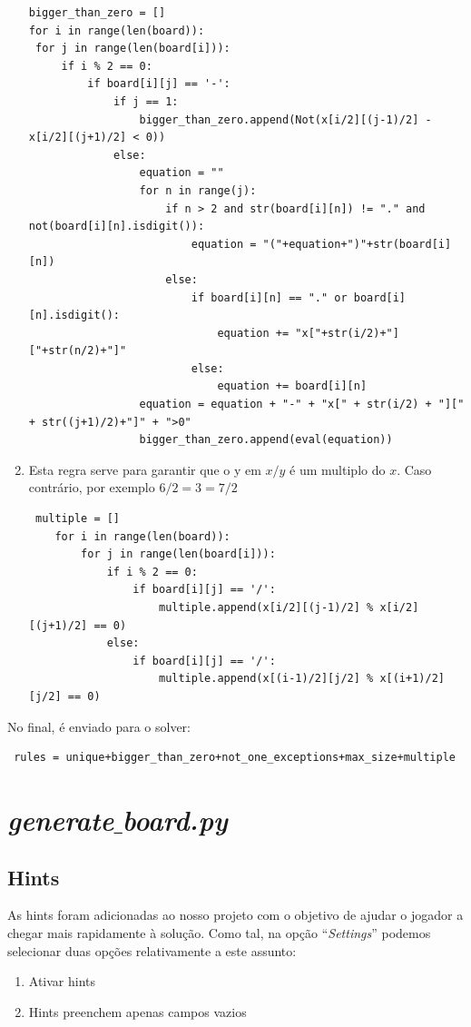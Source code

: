\documentclass{article}
\begin{document}
\begin{enumerate}
\begin{verbatim}
bigger_than_zero = []
for i in range(len(board)):
 for j in range(len(board[i])):
     if i % 2 == 0:
         if board[i][j] == '-':
             if j == 1:
                 bigger_than_zero.append(Not(x[i/2][(j-1)/2] - x[i/2][(j+1)/2] < 0))
             else:
                 equation = ""
                 for n in range(j):
                     if n > 2 and str(board[i][n]) != "." and not(board[i][n].isdigit()):
                         equation = "("+equation+")"+str(board[i][n])
                     else:
                         if board[i][n] == "." or board[i][n].isdigit():
                             equation += "x["+str(i/2)+"]["+str(n/2)+"]"
                         else:
                             equation += board[i][n]
                 equation = equation + "-" + "x[" + str(i/2) + "][" + str((j+1)/2)+"]" + ">0"
                 bigger_than_zero.append(eval(equation))
\end{verbatim}

\item Esta regra serve para garantir que o y em $x/y$ é um multiplo do $x$. Caso contrário, por exemplo $6/2=3=7/2$
\begin{verbatim}
 multiple = []
    for i in range(len(board)):
        for j in range(len(board[i])):
            if i % 2 == 0:
                if board[i][j] == '/':
                    multiple.append(x[i/2][(j-1)/2] % x[i/2][(j+1)/2] == 0)
            else:
                if board[i][j] == '/':
                    multiple.append(x[(i-1)/2][j/2] % x[(i+1)/2][j/2] == 0)
\end{verbatim}

 \end{enumerate}

No final, é enviado para o solver:
\begin{verbatim}
 rules = unique+bigger_than_zero+not_one_exceptions+max_size+multiple
\end{verbatim}

\section{{\it{generate$\_$board.py}}}
\subsection{Hints}

As hints foram adicionadas ao nosso projeto com o objetivo de ajudar o jogador a chegar mais rapidamente à solução. Como tal, na opção ``{\it{Settings}}'' podemos selecionar duas opções relativamente a este assunto:
\begin{enumerate}
\item Ativar hints
\item Hints preenchem apenas campos vazios
\end{enumerate}
\end{document}
